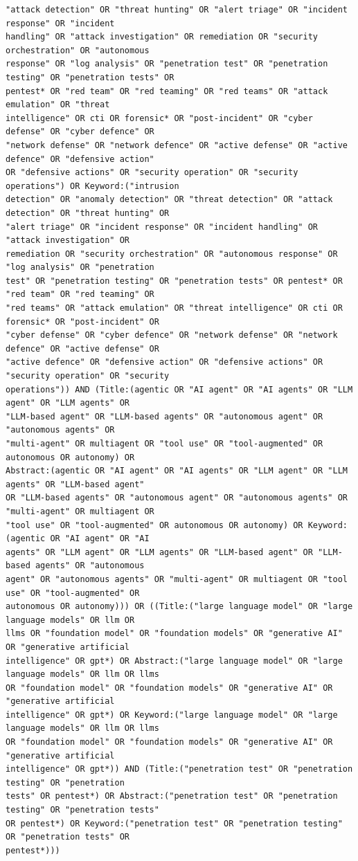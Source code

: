 \begin{lstlisting}
"attack detection" OR "threat hunting" OR "alert triage" OR "incident response" OR "incident
handling" OR "attack investigation" OR remediation OR "security orchestration" OR "autonomous
response" OR "log analysis" OR "penetration test" OR "penetration testing" OR "penetration tests" OR
pentest* OR "red team" OR "red teaming" OR "red teams" OR "attack emulation" OR "threat
intelligence" OR cti OR forensic* OR "post-incident" OR "cyber defense" OR "cyber defence" OR
"network defense" OR "network defence" OR "active defense" OR "active defence" OR "defensive action"
OR "defensive actions" OR "security operation" OR "security operations") OR Keyword:("intrusion
detection" OR "anomaly detection" OR "threat detection" OR "attack detection" OR "threat hunting" OR
"alert triage" OR "incident response" OR "incident handling" OR "attack investigation" OR
remediation OR "security orchestration" OR "autonomous response" OR "log analysis" OR "penetration
test" OR "penetration testing" OR "penetration tests" OR pentest* OR "red team" OR "red teaming" OR
"red teams" OR "attack emulation" OR "threat intelligence" OR cti OR forensic* OR "post-incident" OR
"cyber defense" OR "cyber defence" OR "network defense" OR "network defence" OR "active defense" OR
"active defence" OR "defensive action" OR "defensive actions" OR "security operation" OR "security
operations")) AND (Title:(agentic OR "AI agent" OR "AI agents" OR "LLM agent" OR "LLM agents" OR
"LLM-based agent" OR "LLM-based agents" OR "autonomous agent" OR "autonomous agents" OR
"multi-agent" OR multiagent OR "tool use" OR "tool-augmented" OR autonomous OR autonomy) OR
Abstract:(agentic OR "AI agent" OR "AI agents" OR "LLM agent" OR "LLM agents" OR "LLM-based agent"
OR "LLM-based agents" OR "autonomous agent" OR "autonomous agents" OR "multi-agent" OR multiagent OR
"tool use" OR "tool-augmented" OR autonomous OR autonomy) OR Keyword:(agentic OR "AI agent" OR "AI
agents" OR "LLM agent" OR "LLM agents" OR "LLM-based agent" OR "LLM-based agents" OR "autonomous
agent" OR "autonomous agents" OR "multi-agent" OR multiagent OR "tool use" OR "tool-augmented" OR
autonomous OR autonomy))) OR ((Title:("large language model" OR "large language models" OR llm OR
llms OR "foundation model" OR "foundation models" OR "generative AI" OR "generative artificial
intelligence" OR gpt*) OR Abstract:("large language model" OR "large language models" OR llm OR llms
OR "foundation model" OR "foundation models" OR "generative AI" OR "generative artificial
intelligence" OR gpt*) OR Keyword:("large language model" OR "large language models" OR llm OR llms
OR "foundation model" OR "foundation models" OR "generative AI" OR "generative artificial
intelligence" OR gpt*)) AND (Title:("penetration test" OR "penetration testing" OR "penetration
tests" OR pentest*) OR Abstract:("penetration test" OR "penetration testing" OR "penetration tests"
OR pentest*) OR Keyword:("penetration test" OR "penetration testing" OR "penetration tests" OR
pentest*)))
\end{lstlisting}
